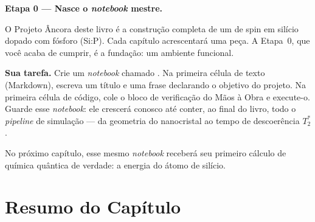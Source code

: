 \begin{caixaancora}
\textbf{Etapa 0 --- Nasce o \emph{notebook} mestre.}

O Projeto Âncora deste livro é a construção completa de um \qubit{} de spin em
silício dopado com fósforo (Si:P). Cada capítulo acrescentará uma peça. A
Etapa~0, que você acaba de cumprir, é a fundação: um ambiente funcional.

\vspace{0.3cm}
\textbf{Sua tarefa.} Crie um \emph{notebook} chamado
. Na primeira célula de texto (Markdown), escreva
um título e uma frase declarando o objetivo do projeto. Na primeira célula de
código, cole o bloco de verificação do Mãos à Obra e execute-o. Guarde esse
\emph{notebook}: ele crescerá conosco até conter, ao final do livro, todo o
\emph{pipeline} de simulação --- da geometria do nanocristal ao tempo de
descoerência $T_2^\ast$.

\vspace{0.3cm}
No próximo capítulo, esse mesmo \emph{notebook} receberá seu primeiro cálculo de
química quântica de verdade: a energia do átomo de silício.
\end{caixaancora}

\section*{Resumo do Capítulo}

